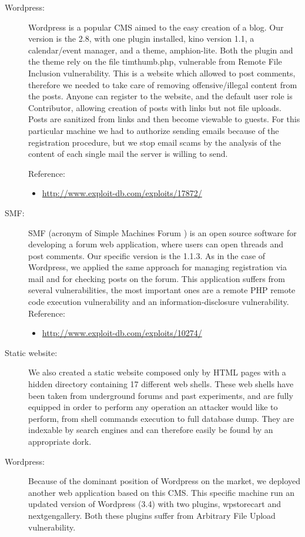 \begin{description}
\item[Wordpress: ] Wordpress \cite{wordpress} is a popular CMS aimed to the easy creation of a blog. Our version is the 2.8, with one plugin installed, kino version 1.1, a calendar/event manager, and a theme, amphion-lite. Both the plugin and the theme rely on the file timthumb.php, vulnerable from Remote File Inclusion vulnerability. This is a website which allowed to post comments, therefore we needed to take care of removing offensive/illegal content from the posts. Anyone can register to the website, and the default user role is Contributor, allowing creation of posts with links but not file uploads. Posts are sanitized from links and then become viewable to guests. For this particular machine we had to authorize sending emails because of the registration procedure, but we stop email scams by the analysis of the content of each single mail the server is willing to send.

Reference:
\begin{itemize}
\item
\url{http://www.exploit-db.com/exploits/17872/}
\end{itemize}

\item[SMF: ] SMF (acronym of Simple Machines Forum \cite{smf}) is an open source software for developing a forum web application, where users can open threads and post comments. Our specific version is the 1.1.3. As in the case of Wordpress, we applied the same approach for managing registration via mail and for checking posts on the forum. This application suffers from several vulnerabilities, the most important ones are a remote PHP remote code execution vulnerability and an information-disclosure vulnerability.
Reference:
\begin{itemize}
\item
\url{http://www.exploit-db.com/exploits/10274/}
\end{itemize}

\item[Static website: ] We also created a static website composed only by HTML pages with a hidden directory containing 17 different web shells. These web shells have been taken from underground forums and past experiments, and are fully equipped in order to perform any operation an attacker would like to perform, from shell commands execution to full database dump. They are indexable by search engines and can therefore easily be found by an appropriate dork.

\item[Wordpress: ] Because of the dominant position of Wordpress on the market, we deployed another web application based on this CMS. This specific machine run an updated version of Wordpress (3.4) with two plugins, wpstorecart and nextgengallery. Both these plugins suffer from Arbitrary File Upload vulnerability.


\end{description}
